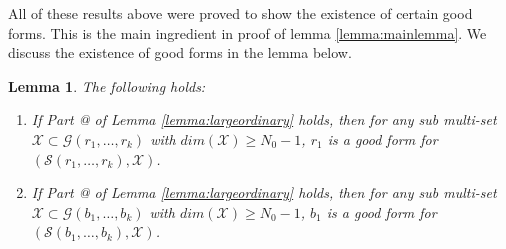\documentclass[12pt]{caltech_thesis}
\makeatletter
\theoremstyle{plain}
\newtheorem{lemma}{Lemma}
\theoremstyle{definition}
\newcommand{\MS}{\mathcal{S}}
\newcommand{\MG}{\mathcal{G}}
\newcommand{\MX}{\mathcal{X}}
\newcommand*{\rom}[1]{\expandafter\@slowromancap\romannumeral #1@}
\makeatother
\begin{document}
 
 
 
 
All of these results above were proved to show the existence of certain good forms. This is the main ingredient in 
proof of lemma \ref{lemma:mainlemma}. We discuss the existence of good forms in the lemma below. 






\begin{lemma}\label{theorem:recontheorem}
The following holds:
\begin{enumerate}
 \item  If Part \rom{1} of Lemma \ref{lemma:largeordinary} holds, then for any sub multi-set $\MX\subset \MG(r_1,\ldots,r_k)$
 with $dim(\MX) \geq N_0-1$, $r_1$ is a 
 good form for $(\MS(r_1,\ldots,r_k),\MX)$.

 \item  If Part \rom{2} of Lemma \ref{lemma:largeordinary} holds, then for any sub multi-set $\MX\subset \MG(b_1,\ldots,b_k)$
 with $dim(\MX) \geq N_0-1$, $b_1$ is a 
 good form for $(\MS(b_1,\ldots,b_k),\MX)$.
\end{enumerate}
\end{lemma}
\end{document}
